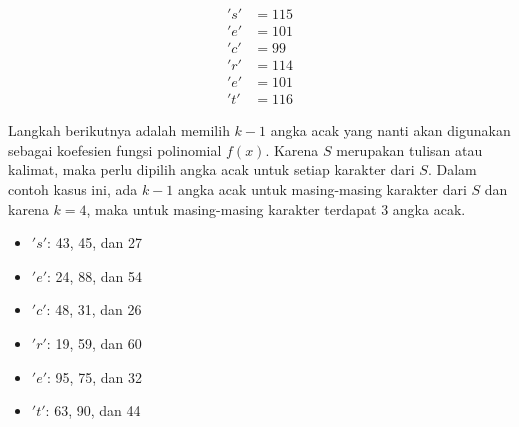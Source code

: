 \begin{align*}
	's' &= 115 \\
	'e' &= 101 \\
	'c' &= 99 \\
	'r' &= 114 \\
	'e' &= 101 \\
	't' &= 116
\end{align*}

Langkah berikutnya adalah memilih \begin{math}k-1\end{math} angka acak yang nanti akan digunakan sebagai koefesien fungsi polinomial \begin{math}f(x)\end{math}. Karena \begin{math}S\end{math} merupakan tulisan atau kalimat, maka perlu dipilih angka acak untuk setiap karakter dari \begin{math}S\end{math}. Dalam contoh kasus ini, ada \begin{math}k-1\end{math} angka acak untuk masing-masing karakter dari \begin{math}S\end{math} dan karena \begin{math}k=4\end{math}, maka untuk masing-masing karakter terdapat 3 angka acak.
\begin{itemize}
	\item \begin{math}'s'\end{math}: 43, 45, dan 27
	\item \begin{math}'e'\end{math}: 24, 88, dan 54
	\item \begin{math}'c'\end{math}: 48, 31, dan 26
	\item \begin{math}'r'\end{math}: 19, 59, dan 60
	\item \begin{math}'e'\end{math}: 95, 75, dan 32
	\item \begin{math}'t'\end{math}: 63, 90, dan 44
\end{itemize}

